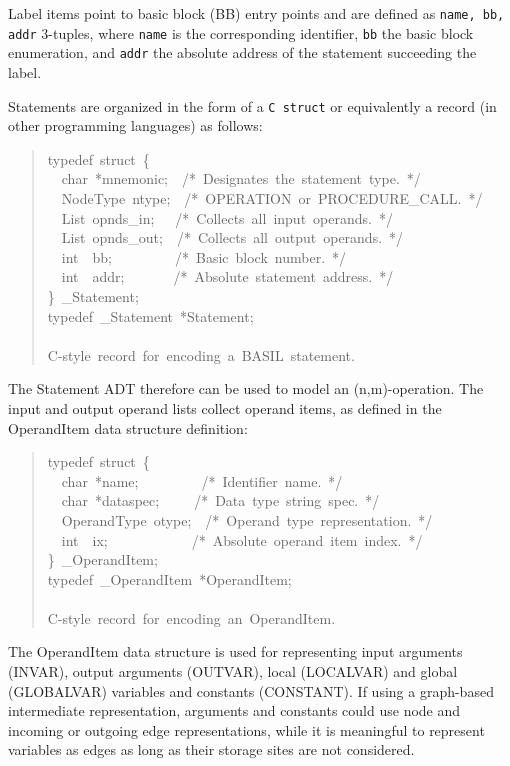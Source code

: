 \documentclass[a4paper]{article}
\begin{document}
Label items point to basic block (BB) entry points and are defined as
\texttt{name, bb, addr} 3-tuples, where \texttt{name} is the corresponding identifier,
\texttt{bb} the basic block enumeration, and \texttt{addr} the absolute address of the
statement succeeding the label.

Statements are organized in the form of a \texttt{C struct} or equivalently a record
(in other programming languages) as follows:
%
\begin{quote}{\ttfamily \raggedright \noindent
typedef~struct~\{\\
~~char~*mnemonic;~~/*~Designates~the~statement~type.~*/\\
~~NodeType~ntype;~~/*~OPERATION~or~PROCEDURE\_CALL.~*/\\
~~List~opnds\_in;~~~/*~Collects~all~input~operands.~*/\\
~~List~opnds\_out;~~/*~Collects~all~output~operands.~*/\\
~~int~~bb;~~~~~~~~~/*~Basic~block~number.~*/\\
~~int~~addr;~~~~~~~/*~Absolute~statement~address.~*/\\
\}~\_Statement;\\
typedef~\_Statement~*Statement;\\
~\\
C-style~record~for~encoding~a~BASIL~statement.
}
\end{quote}

The Statement ADT therefore can be used to model an (n,m)-operation. The input
and output operand lists collect operand items, as defined in the OperandItem
data structure definition:
%
\begin{quote}{\ttfamily \raggedright \noindent
typedef~struct~\{\\
~~char~*name;~~~~~~~~~/*~Identifier~name.~*/\\
~~char~*dataspec;~~~~~/*~Data~type~string~spec.~*/\\
~~OperandType~otype;~~/*~Operand~type~representation.~*/\\
~~int~~ix;~~~~~~~~~~~~/*~Absolute~operand~item~index.~*/\\
\}~\_OperandItem;\\
typedef~\_OperandItem~*OperandItem;\\
~\\
C-style~record~for~encoding~an~OperandItem.
}
\end{quote}

The OperandItem data structure is used for representing input arguments
(INVAR), output arguments (OUTVAR), local (LOCALVAR) and global (GLOBALVAR)
variables and constants (CONSTANT). If using a graph-based intermediate
representation, arguments and constants could use node and incoming or
outgoing edge representations, while it is meaningful to represent variables as
edges as long as their storage sites are not considered.
\end{document}
